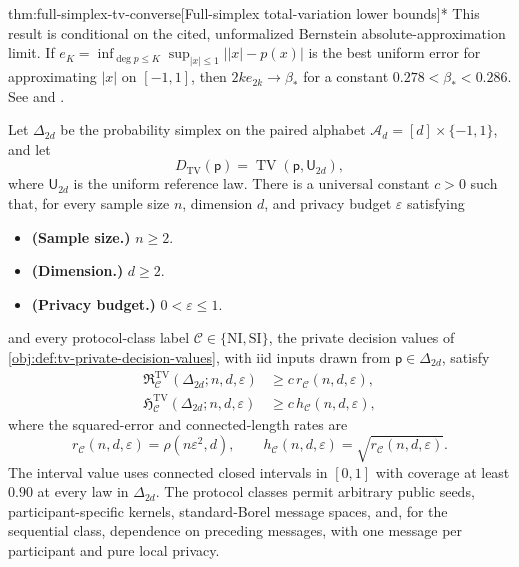 \begin{theoremv}{thm:full-simplex-tv-converse}[Full-simplex total-variation lower bounds]*
This result is conditional on the cited, unformalized Bernstein absolute-approximation limit. If \(e_K=\inf_{\deg p\le K}\sup_{|x|\le1}\lvert |x|-p(x)\rvert\) is the best uniform error for approximating \(|x|\) on \([-1,1]\), then \(2k e_{2k}\to\beta_*\) for a constant \(0.278<\beta_*<0.286\). See \citet[Section 3.1]{CaiLow2011Nonsmooth} and \citet{Bernstein1913}.

Let \(\Delta_{2d}\) be the probability simplex on the paired alphabet \(\mathcal A_d=[d]\times\{-1,1\}\), and let
\[
D_{\mathrm{TV}}(\mathsf p)=\operatorname{TV}(\mathsf p,\mathsf U_{2d}),
\]
where \(\mathsf U_{2d}\) is the uniform reference law. There is a universal constant \(c>0\) such that, for every sample size \(n\), dimension \(d\), and privacy budget \(\varepsilon\) satisfying
\begin{itemize}
\item \textbf{(Sample size.)} \(n\ge2\).
\item \textbf{(Dimension.)} \(d\ge2\).
\item \textbf{(Privacy budget.)} \(0<\varepsilon\le1\).
\end{itemize}
and every protocol-class label \(\mathcal C\in\{\mathrm{NI},\mathrm{SI}\}\), the private decision values of \cref{obj:def:tv-private-decision-values}, with iid inputs drawn from \(\mathsf p\in\Delta_{2d}\), satisfy
\[
\begin{aligned}
\mathfrak R^{\mathrm{TV}}_{\mathcal C}(\Delta_{2d};n,d,\varepsilon)
&\ge c\,r_{\mathcal C}(n,d,\varepsilon),\\
\mathfrak H^{\mathrm{TV}}_{\mathcal C}(\Delta_{2d};n,d,\varepsilon)
&\ge c\,h_{\mathcal C}(n,d,\varepsilon),
\end{aligned}
\]
where the squared-error and connected-length rates are
\[
r_{\mathcal C}(n,d,\varepsilon)=\rho(n\varepsilon^2,d),
\qquad
h_{\mathcal C}(n,d,\varepsilon)=\sqrt{r_{\mathcal C}(n,d,\varepsilon)}.
\]
The interval value uses connected closed intervals in \([0,1]\) with coverage at least \(0.90\) at every law in \(\Delta_{2d}\). The protocol classes permit arbitrary public seeds, participant-specific kernels, standard-Borel message spaces, and, for the sequential class, dependence on preceding messages, with one message per participant and pure local privacy.
\end{theoremv}

